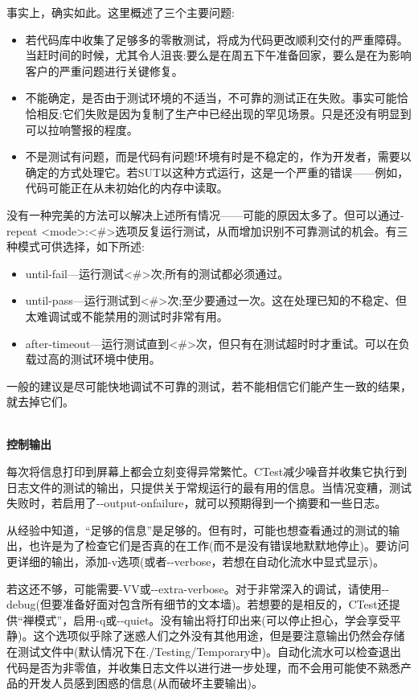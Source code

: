 事实上，确实如此。这里概述了三个主要问题:

\begin{itemize}
\item 
若代码库中收集了足够多的零散测试，将成为代码更改顺利交付的严重障碍。当赶时间的时候，尤其令人沮丧:要么是在周五下午准备回家，要么是在为影响客户的严重问题进行关键修复。

\item 
不能确定，是否由于测试环境的不适当，不可靠的测试正在失败。事实可能恰恰相反:它们失败是因为复制了生产中已经出现的罕见场景。只是还没有明显到可以拉响警报的程度。

\item 
不是测试有问题，而是代码有问题!环境有时是不稳定的，作为开发者，需要以确定的方式处理它。若SUT以这种方式运行，这是一个严重的错误——例如，代码可能正在从未初始化的内存中读取。
\end{itemize}

没有一种完美的方法可以解决上述所有情况——可能的原因太多了。但可以通过-repeat <mode>:<\#>选项反复运行测试，从而增加识别不可靠测试的机会。有三种模式可供选择，如下所述:

\begin{itemize}
\item 
until-fail—运行测试<\#>次;所有的测试都必须通过。

\item 
until-pass—运行测试到<\#>次;至少要通过一次。这在处理已知的不稳定、但太难调试或不能禁用的测试时非常有用。

\item 
after-timeout—运行测试直到<\#>次，但只有在测试超时时才重试。可以在负载过高的测试环境中使用。
\end{itemize}

一般的建议是尽可能快地调试不可靠的测试，若不能相信它们能产生一致的结果，就去掉它们。

\hspace*{\fill} \\ %
\noindent
\textbf{控制输出}

每次将信息打印到屏幕上都会立刻变得异常繁忙。CTest减少噪音并收集它执行到日志文件的测试的输出，只提供关于常规运行的最有用的信息。当情况变糟，测试失败时，若启用了-{}-output-onfailure，就可以预期得到一个摘要和一些日志。

从经验中知道，“足够的信息”是足够的。但有时，可能也想查看通过的测试的输出，也许是为了检查它们是否真的在工作(而不是没有错误地默默地停止)。要访问更详细的输出，添加-v选项(或者-{}-verbose，若想在自动化流水中显式显示)。

若这还不够，可能需要-VV或-{}-extra-verbose。对于非常深入的调试，请使用-{}-debug(但要准备好面对包含所有细节的文本墙)。若想要的是相反的，CTest还提供“禅模式”，启用-q或-{}-quiet。没有输出将打印出来(可以停止担心，学会享受平静)。这个选项似乎除了迷惑人们之外没有其他用途，但是要注意输出仍然会存储在测试文件中(默认情况下在./Testing/Temporary中)。自动化流水可以检查退出代码是否为非零值，并收集日志文件以进行进一步处理，而不会用可能使不熟悉产品的开发人员感到困惑的信息(从而破坏主要输出)。

